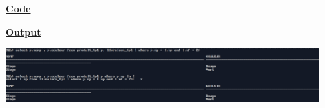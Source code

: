 \newpage
{}

\textbf{\underline{Code}}


\vspace{1cm}
\textbf{\underline{Output}}
\vspace{1cm}
\begin{center}
    \includegraphics[width=0.9\textwidth]{Questions/q16/q16.png}
\end{center}


